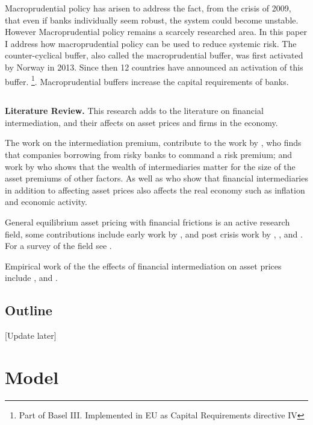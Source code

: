 \documentclass[11pt]{article}
\begin{document}
Macroprudential policy has arisen to address the fact, from the crisis of 2009, that even if banks individually seem robust, the system could become unstable.
However Macroprudential policy remains a scarcely researched area. In this paper I address how macroprudential policy can be used to reduce systemic risk. The counter-cyclical buffer, also called the macroprudential buffer, was first activated by Norway in 2013. Since then 12 countries have announced an activation of this buffer. \footnote{Part of Basel III. Implemented in EU as Capital Requirements directive IV}. Macroprudential buffers increase the capital requirements of banks.


\subsection*{}
\vspace{-1.5cm}
\textbf{Literature Review.} 
This research adds to the literature on financial intermediation, and their affects on asset prices and firms in the economy.

The work on the intermediation premium, contribute to the work by \citet{Marchuk2017}, who finds that companies borrowing from risky banks to command a risk premium; and work by \citet{Adrian2014} who shows that the wealth of intermediaries matter for the size of the asset premiums of other factors. As well as \citet{Adrian2010} who show that financial intermediaries in addition to affecting asset prices also affects the real economy such as inflation and economic activity.

General equilibrium asset pricing with financial frictions is an active research field, some contributions include early work by \citet{Geanakoplos1997, geanakoplos2003}, and post crisis work by \citet{Brunnermeier2009}, \citet{He2013}, and \citet{Brunnermeier2014}. For a survey of the field see \citet{Brunnermeier2013}.

Empirical work of the the effects of financial intermediation on asset prices include \citet{Adrian2010}, \citet{Adrian2014} and \citet{Marchuk2017}.

\subsection*{Outline}

[Update later]




\section{Model} \label{sec:model}
\end{document}
